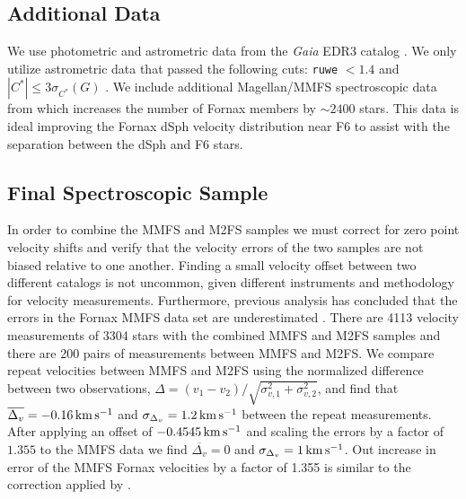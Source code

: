 \documentclass[twocolumn]{aastex63}
\begin{document}
\subsection{Additional Data}

We use photometric and astrometric data from the {\it Gaia} EDR3 catalog \citep{Gaia_Brown_2021A&A...649A...1G}.
We only utilize astrometric data that passed the following cuts: {\tt ruwe} $<1.4$ \citep{Gaia_Lindegren_2021A&A...649A...2L} and $|C^*| \le 3 \sigma_{C^*}(G)$ \citep{Gaia_Riello2021A&A...649A...3R}. 
We include additional   Magellan/MMFS spectroscopic data from \citet{Walker2009AJ....137.3100W} which increases the number of Fornax members by $\sim2400$ stars.  This data is ideal improving the Fornax dSph velocity distribution near F6 to assist with the separation between the dSph and F6 stars.


\subsection{Final Spectroscopic Sample}


In order to combine the MMFS and M2FS samples we must correct for zero point velocity shifts and verify that the velocity errors of the two samples are not biased relative to one another.  Finding a small velocity offset between two different catalogs is not uncommon, given different instruments and methodology for velocity measurements.
Furthermore, previous analysis has concluded that the errors in the Fornax MMFS data set are underestimated \citep{Minor2013ApJ...779..116M}.  There are 4113 velocity measurements of 3304 stars with the combined MMFS and M2FS samples and 
there are 200 pairs of measurements between MMFS and M2FS.
We compare repeat velocities between MMFS and M2FS using the normalized difference between two observations, $\Delta=(v_1-v_2)/\sqrt{\sigma_{v,1}^2+\sigma_{v,2}^2}$, and find that $\overline{\Delta_v} = -0.16 \mathrm{\,km} \mathrm{\,s}^{-1}$ and $\sigma_{\Delta_v} = 1.2 \mathrm{\,km} \mathrm{\,s}^{-1}$ between the repeat measurements. 
After applying an offset of $-0.4545 \mathrm{\,km} \mathrm{\,s}^{-1}$ and scaling the errors by a factor of $1.355$ to the MMFS data we find $\overline{\Delta_v} = 0$ and $\sigma_{\Delta_v} = 1 \mathrm{\,km} \mathrm{\,s}^{-1}$.  
Out increase in error of the MMFS Fornax velocities by a factor of 1.355 is similar to the correction applied by \citet{Minor2013ApJ...779..116M}.
\end{document}
